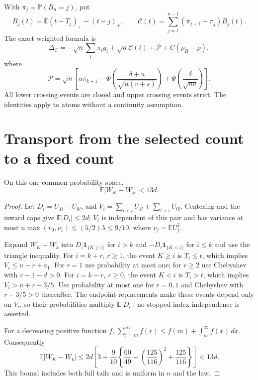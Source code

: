 \documentclass[11pt]{article}
\newcommand{\E}{\mathbb E}\newcommand{\Pp}{\mathbb P}
\begin{document}
With $\pi_j=\Pp(B_n=j)$, put
\[
 B_j(t)=\E(t-T_j)_+-(t-j)_+,\qquad
 \mathcal C(t)=\sum_{j=1}^{n-1}(\pi_{j+1}-\pi_j)B_j(t).
\]
The exact weighted formula is
\begin{equation}\label{eq:master}
 \Delta_C=-\sqrt n\sum_i\pi_i g_i+\sqrt n\mathcal C(t)
                    +\mathcal P+C(\rho_B-\rho),
\end{equation}
where
\[
 \mathcal P=\sqrt n\left[u\pi_{k+1}
  -\Phi\!\left(\frac{\delta+u}{\sqrt{n(v+s)}}\right)
  +\Phi\!\left(\frac\delta{\sqrt{nv}}\right)\right].
\]
All lower crossing events are closed and upper crossing events strict.
The identities apply to atoms without a continuity assumption.

\section{Transport from the selected count to a fixed count}
\begin{lemma}\label{lem:transport}
On this one common probability space,
\[
                         \E|W_K-W_k|<13d.
\]
\end{lemma}
\begin{proof}
Let $D_i=U_{1i}-U_{0i}$, and
$V_i=\sum_{l<i}U_{1l}+\sum_{l>i}U_{0l}$.
Centering and the inward caps give $\E|D_i|\le2d$; $V_i$ is
independent of this pair and has variance at most
$n\max(v_0,v_1)\le(5/2)\lambda\le9/10$, where $v_j=\E U_j^2$.

Expand $W_K-W_k$ into $D_i\mathbf1_{\{K\ge i\}}$ for $i>k$
and $-D_i\mathbf1_{\{K<i\}}$ for $i\le k$ and use the triangle
inequality. For $i=k+r$, $r\ge1$, the event $K\ge i$ is
$T_i\le t$, which implies $V_i\le u-r+a_1$.
For $r=1$ use probability at most one; for $r\ge2$ use
Chebyshev with $r-1-d>0$.
For $i=k-r$, $r\ge0$, the event $K<i$ is $T_i>t$, which implies
$V_i>u+r-3/5$. Use probability at most one for $r=0,1$ and
Chebyshev with $r-3/5>0$ thereafter. The endpoint replacements make
these events depend only on $V_i$, so their probabilities multiply
$\E|D_i|$; no stopped-index independence is asserted.

For a decreasing positive function $f$,
$\sum_{r=m}^{\infty}f(r)\le f(m)+\int_m^\infty f(x)\,dx$.
Consequently
\[
 \E|W_K-W_k|\le2d\left[3+\frac9{10}
 \left\{\frac{60}{49}+\left(\frac{125}{116}\right)^2
                        +\frac{125}{116}\right\}\right]<13d.
\]
This bound includes both full tails and is uniform in $n$ and the law.
\end{proof}
\end{document}
